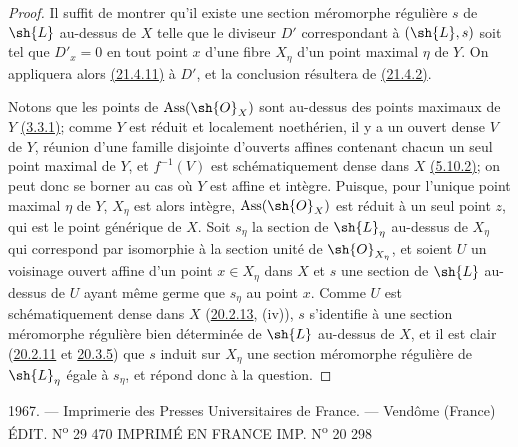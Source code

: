 \begin{proof}
Il suffit de montrer qu'il existe une section méromorphe régulière $s$
de $\sh{L}$ au-dessus de $X$ telle que le diviseur $D'$ correspondant
à $(\sh{L},s)$ soit tel que $D'_x=0$ en tout point $x$ d'une fibre
$X_\eta$ d'un point maximal $\eta$ de $Y$. On appliquera alors
{\hyperlink{ega4.c04.cor.21-4-11}{(21.4.11)}} à $D'$, et la conclusion
résultera de {\hyperlink{ega4.c04.def.21-4-2}{(21.4.2)}}.

Notons que les points de $\operatorname{Ass}(\sh{O}_X)$ sont au-dessus
des points maximaux de $Y$ {\hyperlink{ega4.c04.prop.3-3-1}{(3.3.1)}};
comme $Y$ est réduit et localement noethérien, il y a un ouvert dense
$V$ de $Y$, réunion d'une famille disjointe d'ouverts affines contenant
chacun un seul point maximal de $Y$, et $f^{-1}(V)$ est
schématiquement dense dans $X$
{\hyperlink{ega4.c04.prop.5-10-2}{(5.10.2)}}; on peut donc se borner au
cas où $Y$ est affine et intègre. Puisque, pour l'unique point maximal
$\eta$ de $Y$, $X_\eta$ est alors intègre,
$\operatorname{Ass}(\sh{O}_X)$ est réduit à un seul point $z$, qui est
le point générique de $X$. Soit $s_\eta$ la section de $\sh{L}_\eta$
au-dessus de $X_\eta$ qui correspond par isomorphie à la section unité
de $\sh{O}_{X_\eta}$, et soient $U$ un voisinage ouvert affine d'un
point $x\in X_\eta$ dans $X$ et $s$ une section de $\sh{L}$ au-dessus
de $U$ ayant même germe que $s_\eta$ au point $x$. Comme $U$ est
schématiquement dense dans $X$
({\hyperlink{ega4.c04.statement.20-2-13}{20.2.13}}, (iv)), $s$
s'identifie à une section méromorphe régulière bien déterminée de
$\sh{L}$ au-dessus de $X$, et il est clair
({\hyperlink{ega4.c04.prop.20-2-11}{20.2.11}} et
{\hyperlink{ega4.c04.prop.20-3-5}{20.3.5}}) que $s$ induit sur $X_\eta$
une section méromorphe régulière de $\sh{L}_\eta$ égale à $s_\eta$, et
répond donc à la question.
\end{proof}

\bigskip
\begin{center}
\small
1967. --- Imprimerie des Presses Universitaires de France. --- Vendôme
(France)\\
ÉDIT. N\textsuperscript{o} 29 470\qquad
IMPRIMÉ EN FRANCE\qquad
IMP. N\textsuperscript{o} 20 298
\end{center}
